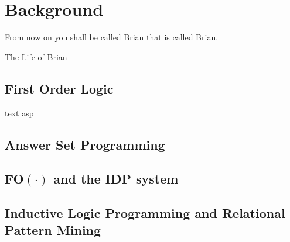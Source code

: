 \chapter{Background} \label{ch:background}
\epigraph{From now on you shall be called Brian that is called Brian.}{The Life of Brian}
\section{First Order Logic}
text \acrshort{asp}

\section{Answer Set Programming}

\section{FO$(\cdot)$ and the IDP system}

\section{Inductive Logic Programming and Relational Pattern Mining}
